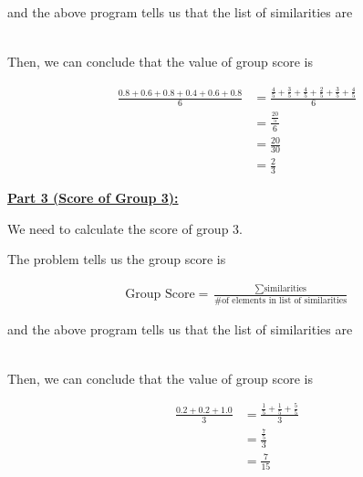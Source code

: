 \documentclass[12pt]{article}
\begin{document}
\begin{mdframed}
    \bigskip

    and the above program tells us that the list of similarities are

    \begin{align}
        [0.8, 0.6, 0.8, 0.4, 0.6, 0.8]
    \end{align}

    \bigskip

    Then, we can conclude that the value of group score is

    \begin{align}
        \frac{0.8 + 0.6 + 0.8 + 0.4 + 0.6 + 0.8}{6} &= \frac{\frac{4}{5} + \frac{3}{5} + \frac{4}{5} + \frac{2}{5} + \frac{3}{5} + \frac{4}{5}}{6}\\
        &= \frac{\frac{20}{5}}{6}\\
        &= \frac{20}{30}\\
        &= \frac{2}{3}
    \end{align}

    \bigskip

    \underline{\textbf{Part 3 (Score of Group 3):}}

    \bigskip

    We need to calculate the score of group 3.

    \bigskip

    The problem tells us the group score is

    \begin{align}
        \text{Group Score} = \frac{\sum \text{similarities}}{\text{\# of elements in list of similarities}}
    \end{align}

    \bigskip

    and the above program tells us that the list of similarities are

    \begin{align}
        [0.2, 0.2, 1.0]
    \end{align}

    \bigskip

    Then, we can conclude that the value of group score is

    \begin{align}
        \frac{0.2 + 0.2 + 1.0}{3} &= \frac{\frac{1}{5} + \frac{1}{5} + \frac{5}{5}}{3}\\
        &= \frac{\frac{7}{5}}{3}\\
        &= \frac{7}{15}
    \end{align}

    \color{black}
\end{mdframed}
\end{document}
